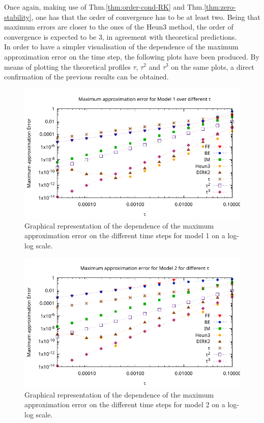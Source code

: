 \documentclass[11pt]{article}
\theoremstyle{theorem}
\theoremstyle{definition}
\begin{document}
Once again, making use of Thm.\ref{thm:order-cond-RK} and Thm.\ref{thm:zero-stability}, one has that the order of convergence has to be at least two. Being that maximum errors are closer to the ones of the Heun3 method, the order of convergence is expected to be 3, in agreement with theoretical predictions.\\

In order to have a simpler visualisation of the dependence of the maximum approximation error on the time step, the following plots have been produced. By means of plotting the theoretical profiles $\tau$, $\tau^2$ and $\tau^3$ on the same plots, a direct confirmation of the previous results can be obtained.\\

\begin{figure}[H]
	\begin{center}
		\includegraphics[width=1.0\textwidth]{ME_M1}
	\end{center}
	\caption{Graphical representation of the dependence of the maximum approximation error on the different time steps for model 1 on a log-log scale.
		\label{fig:Err_M1}}
\end{figure}

\begin{figure}[H]
	\begin{center}
		\includegraphics[width=1.0\textwidth]{ME_M2}
	\end{center}
	\caption{Graphical representation of the dependence of the maximum approximation error on the different time steps for model 2 on a log-log scale.
		\label{fig:Err_M2}}
\end{figure}
\end{document}
